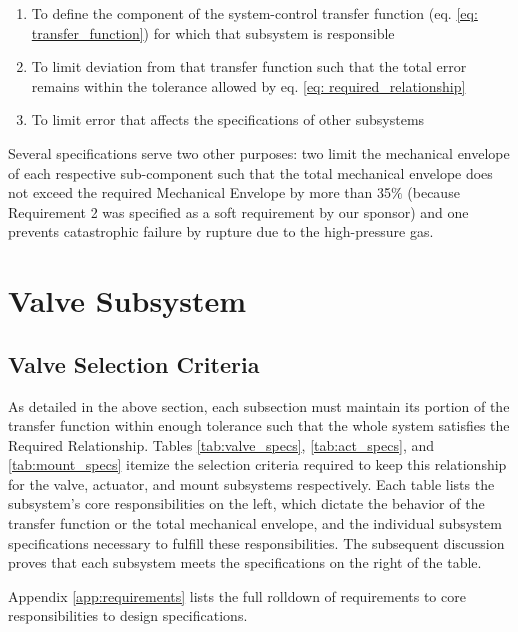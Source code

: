 \documentclass[12pt, letterpaper]{report}%
\newcounter{mycounter}           %
\newcounter{sub}[mycounter]      %
\begin{document}
        \begin{enumerate}
            \item To define the component of the system-control transfer function (eq. \ref{eq: transfer_function}) for which that subsystem is responsible
            \item To limit deviation from that transfer function such that the total error remains within the tolerance allowed by eq. \ref{eq: required_relationship}
            \item To limit error that affects the specifications of other subsystems
        \end{enumerate}

        Several specifications serve two other purposes: two limit the mechanical envelope of each respective sub-component
        such that the total mechanical envelope does not exceed the required Mechanical Envelope by more than 35$\%$ 
        (because Requirement 2 was specified as a soft requirement by our sponsor)
        and one prevents catastrophic failure by rupture due to the high-pressure gas.
 


    \section{Valve Subsystem}
    \label{sec:valve_sub_description}

        \subsection{Valve Selection Criteria}
        \label{subsec:valve_sel_crit}

            As detailed in the above section, each subsection must maintain its portion of the transfer function within enough tolerance such that the whole system satisfies the Required Relationship.
            Tables \ref{tab:valve_specs}, \ref{tab:act_specs}, and \ref{tab:mount_specs} itemize the selection criteria required to keep this relationship for the valve, actuator, and mount subsystems respectively.
            Each table lists the subsystem's core responsibilities on the left, which dictate the behavior of the transfer function or the total mechanical envelope,
            and the individual subsystem specifications necessary to fulfill these responsibilities. The subsequent discussion proves that each subsystem meets the specifications on the right of the table.

            Appendix \ref{app:requirements} lists the full rolldown of requirements to core responsibilities to design specifications.
\end{document}
